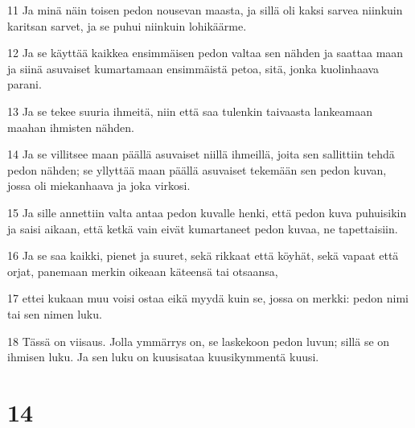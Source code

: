 \par 11 Ja minä näin toisen pedon nousevan maasta, ja sillä oli kaksi sarvea niinkuin karitsan sarvet, ja se puhui niinkuin lohikäärme.
\par 12 Ja se käyttää kaikkea ensimmäisen pedon valtaa sen nähden ja saattaa maan ja siinä asuvaiset kumartamaan ensimmäistä petoa, sitä, jonka kuolinhaava parani.
\par 13 Ja se tekee suuria ihmeitä, niin että saa tulenkin taivaasta lankeamaan maahan ihmisten nähden.
\par 14 Ja se villitsee maan päällä asuvaiset niillä ihmeillä, joita sen sallittiin tehdä pedon nähden; se yllyttää maan päällä asuvaiset tekemään sen pedon kuvan, jossa oli miekanhaava ja joka virkosi.
\par 15 Ja sille annettiin valta antaa pedon kuvalle henki, että pedon kuva puhuisikin ja saisi aikaan, että ketkä vain eivät kumartaneet pedon kuvaa, ne tapettaisiin.
\par 16 Ja se saa kaikki, pienet ja suuret, sekä rikkaat että köyhät, sekä vapaat että orjat, panemaan merkin oikeaan käteensä tai otsaansa,
\par 17 ettei kukaan muu voisi ostaa eikä myydä kuin se, jossa on merkki: pedon nimi tai sen nimen luku.
\par 18 Tässä on viisaus. Jolla ymmärrys on, se laskekoon pedon luvun; sillä se on ihmisen luku. Ja sen luku on kuusisataa kuusikymmentä kuusi.

\chapter{14}

